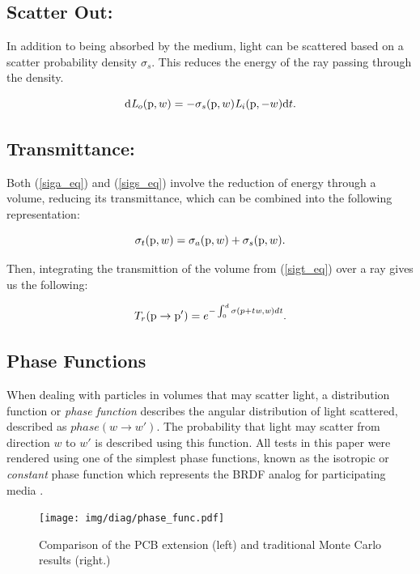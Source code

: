 \documentclass[12pt]{ucthesis}
\newcommand{\captionfonts}{\small\bf\ssp}
\begin{document}
\subsection{Scatter Out:}
In addition to being absorbed by the medium, light can be scattered based on a scatter probability density $\sigma_{s}$.  This reduces the energy of the ray passing through the density.

\begin{equation}
\textup{d}\mathit{L}_{o}(\textup{p},w) = -\sigma_{s}(\textup{p},w) \mathit{L}_{i}(\textup{p},-w)\textup{d}t.
\label{sigs_eq}
\end{equation}

\subsection{Transmittance:}
Both (\ref{siga_eq}) and (\ref{sigs_eq}) involve the reduction of energy through a volume, reducing its transmittance, which can be combined into the following representation:

\begin{equation}
\sigma_{t}(\textup{p},w) = \sigma_{a}(\textup{p},w) + \sigma_{s}(\textup{p}, w).
\label{sigt_eq}
\end{equation}

Then, integrating the transmittion of the volume from (\ref{sigt_eq}) over a ray gives us the following:

\begin{equation}
T_{r}(\textup{p} \to \textup{p}') = e^{-\int_{0}^{d}\sigma (p+t\mathit{w},\mathit{w})d\mathit{t}}.
\label{transmittion_eq}
\end{equation}

\subsection{Phase Functions}
When dealing with particles in volumes that may scatter light, a distribution function or \textit{phase function} describes the angular distribution of light scattered, described as $phase(w \to w')$.  The probability that light may scatter from direction $w$ to $w'$ is described using this function.  All tests in this paper were rendered using one of the simplest phase functions, known as the isotropic or \textit{constant} phase function which represents the BRDF analog for participating media \cite{cerezo}.

\begin{figure}[h!]
    \centering
    \texttt{[image: img/diag/phase\_func.pdf]}
    \captionfonts
    \caption{Comparison of the PCB extension (left) and traditional Monte Carlo results (right.)}
    \label{fig:phase}
\end{figure}
\end{document}
